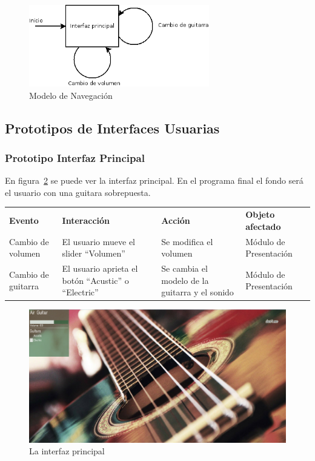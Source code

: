 \documentclass[a4paper,10pt]{article}
\begin{document}
\begin{figure}[hb]
        \centering
        \includegraphics[width=0.7\textwidth]{../imagenes/modelo_de_navegacion.png}
        \caption{Modelo de Navegación}
        \label{fig:navegacion}
\end{figure}
\subsection{Prototipos de Interfaces Usuarias}
\subsubsection{Prototipo Interfaz Principal}
En figura~\ref{fig:ui} se puede ver la interfaz principal. En el programa final
el fondo será el usuario con una guitara sobrepuesta.

\begin{tabularx}{\textwidth}{X X X X}
        \textbf{Evento} & \textbf{Interacción} & \textbf{Acción} & \textbf{Objeto afectado} \\
        Cambio de volumen & El usuario mueve el slider ``Volumen'' & Se
        modifica el volumen & Módulo de Presentación \\
        Cambio de guitarra & El usuario aprieta el botón ``Acustic'' o
        ``Electric'' & Se cambia el modelo de la guitarra y el sonido & Módulo
        de Presentación \\


\end{tabularx}
\begin{figure}[hb]
        \centering
        \includegraphics[width=\textwidth]{../imagenes/ui.png}
        \caption{La interfaz principal}
        \label{fig:ui}
\end{figure}
\newpage
\end{document}

